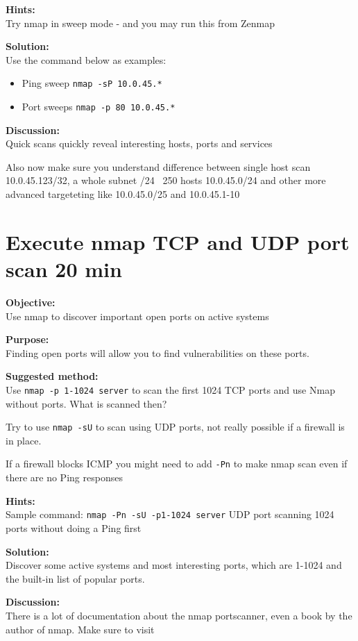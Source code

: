 \documentclass[a4paper,11pt,notitlepage]{report}
\begin{document}
{\bf Hints:} \\
Try nmap in sweep mode - and you may run this from Zenmap

{\bf Solution:}\\
Use the command below as examples:
\begin{itemize}
\item Ping sweep \verb+nmap -sP 10.0.45.*+
\item Port sweeps \verb+nmap -p 80 10.0.45.*+
\end{itemize}

{\bf Discussion:}\\
Quick scans quickly reveal interesting hosts, ports and services

Also now make sure you understand difference between single host scan
10.0.45.123/32, a whole subnet /24 ~250 hosts 10.0.45.0/24 and other more advanced targeteting like 10.0.45.0/25 and 10.0.45.1-10


\chapter{Execute nmap TCP and UDP port scan 20 min}
\label{ex:nmap-synscan}


{\bf Objective:} \\
Use nmap to discover important open ports on active systems

{\bf Purpose:}\\
Finding open ports will allow you to find vulnerabilities on these ports.

{\bf Suggested method:}\\
Use \verb+nmap -p 1-1024 server+ to scan the first 1024 TCP
ports and use Nmap without ports. What is scanned then?

Try to use \verb+nmap -sU+ to scan using UDP ports, not really possible if a firewall is in place.

If a firewall blocks ICMP you might need to add \verb+-Pn+ to make nmap scan even if there are no Ping responses

{\bf Hints:} \\
Sample command: \verb+nmap -Pn -sU -p1-1024 server+ UDP port scanning
1024 ports without doing a Ping first

{\bf Solution:}\\
Discover some active systems and most interesting ports, which are 1-1024 and the built-in list of popular ports.

{\bf Discussion:}\\
There is a lot of documentation about the nmap portscanner, even a book by the author
of nmap. Make sure to visit 
\end{document}
